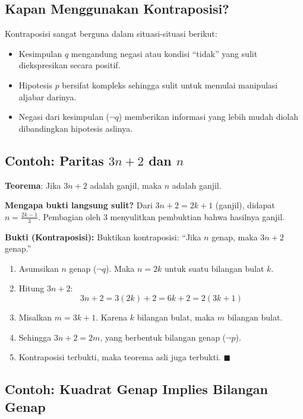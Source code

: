 \subsection{Kapan Menggunakan Kontraposisi?}

Kontraposisi sangat berguna dalam situasi-situasi berikut:
\begin{itemize}
    \item Kesimpulan $q$ mengandung negasi atau kondisi ``tidak'' yang sulit diekspresikan secara positif.
    \item Hipotesis $p$ bersifat kompleks sehingga sulit untuk memulai manipulasi aljabar darinya.
    \item Negasi dari kesimpulan ($\neg q$) memberikan informasi yang lebih mudah diolah dibandingkan hipotesis aslinya.
\end{itemize}

\subsection{Contoh: Paritas \texorpdfstring{$3n+2$}{3n+2} dan \texorpdfstring{$n$}{n}}

\begin{contoh}
\textbf{Teorema}: Jika $3n+2$ adalah ganjil, maka $n$ adalah ganjil.

\textbf{Mengapa bukti langsung sulit?} Dari $3n+2 = 2k+1$ (ganjil), didapat $n = \frac{2k-1}{3}$. Pembagian oleh 3 menyulitkan pembuktian bahwa hasilnya ganjil.

\textbf{Bukti (Kontraposisi):} Buktikan kontraposisi: ``Jika $n$ genap, maka $3n+2$ genap.''

\begin{enumerate}
    \item Asumsikan $n$ genap ($\neg q$). Maka $n = 2k$ untuk suatu bilangan bulat $k$.
    \item Hitung $3n + 2$:
    \[ 3n + 2 = 3(2k) + 2 = 6k + 2 = 2(3k + 1) \]
    \item Misalkan $m = 3k + 1$. Karena $k$ bilangan bulat, maka $m$ bilangan bulat.
    \item Sehingga $3n + 2 = 2m$, yang berbentuk bilangan genap ($\neg p$).
    \item Kontraposisi terbukti, maka teorema asli juga terbukti. $\blacksquare$
\end{enumerate}
\end{contoh}

\subsection{Contoh: Kuadrat Genap Implies Bilangan Genap}

